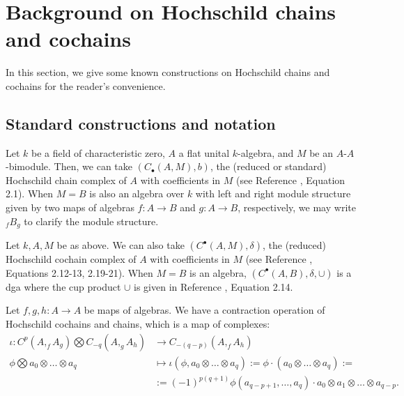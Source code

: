 \chapter{Background on Hochschild chains and cochains}
\label{chap:hochschild}
In this section, we give some known 
constructions on Hochschild chains and 
cochains for the reader's convenience. 
%
\section{Standard constructions and notation}
Let $k$ be a field of characteristic zero, 
$A$ a flat unital $k$-algebra, and $M$ be an 
$A$-$A$-bimodule. Then, we can take 
$(C_\bullet(A,M), b)$, the 
(reduced or standard) Hochschild chain 
complex of $A$ 
with coefficients in $M$ (see Reference 
\cite{T}, Equation 2.1). When $M = B$ is also 
an algebra over $k$ with left and right 
module structure given by two maps of algebras 
$f:A \to B$ and $g:A \to B$, respectively, 
we may write $_fB_g$ to clarify 
the module structure.

Let $k, A, M$ be as above. We can also 
take $(C^\bullet(A,M), \delta)$, the 
(reduced) Hochschild cochain complex of $A$ 
with coefficients in $M$ (see Reference 
\cite{T}, Equations 2.12-13, 2.19-21). When $M=B$ is 
an algebra, $(C^\bullet(A,B), \delta, \cup)$ 
is a dga where the cup product $\cup$ is 
given in Reference \cite{T}, Equation 2.14.

Let $f,g,h:A \to A$ be maps of algebras. 
We have a contraction operation of Hochschild 
cochains and chains, which is a map of complexes:
\begin{align*}
\iota: C^p(A, _fA_g) \bigotimes C_{-q}(A, _gA_h) 
&\longrightarrow 
C_{-(q-p)}(A, _fA_h) \\
\phi \bigotimes a_0\otimes \dots \otimes a_q 
&\mapsto 
\iota(\phi, a_0\otimes \dots \otimes a_q)
:= \phi \cdot (a_0\otimes \dots \otimes a_q) :=\\
&:=
(-1)^{p(q+1)}
\phi(a_{q-p+1},\dots,a_q)\cdot a_0 
\otimes a_1 \otimes \dots \otimes a_{q-p}.
\end{align*}

